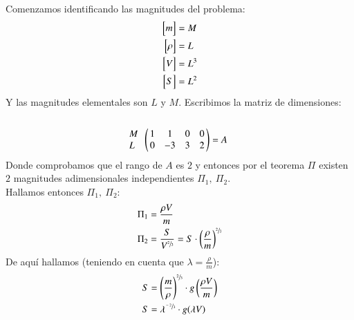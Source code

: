 \begin{ex}[H1.1]
    Comenzamos identificando las magnitudes del problema:
    \begin{align*}
        \mx{m} &= M\\
        \mx{\rho} &= L\\
        \mx{V} &= L^3\\
        \mx{S} &= L^2
    \end{align*}
    Y las magnitudes elementales son $L$ y $M$. Escribimos la matriz de dimensiones:
    $$
    \Dmx{
        ~ & & & & \cr
        M & 1 & 1 & 0 & 0\cr
        L & 0 & -3 & 3 & 2
        } = A
    $$
    Donde comprobamos que el rango de $A$ es $2$ y entonces por el teorema $\Pi$ existen $2$ magnitudes adimensionales independientes $\Pi_1,\ \Pi_2$.\\

    Hallamos entonces $\Pi_1,\ \Pi_2$:
    \begin{align*}
        \Pi_1 &= \frac{\rho V}{m}\\
        \Pi_2 &= \frac{S}{V^{\sfrac{2}{3}}} = S \cdot \left(\frac{\rho}{m}\right)^{\sfrac{2}{3}}
    \end{align*}
    De aquí hallamos (teniendo en cuenta que $\lambda = \frac{\rho}{m}$):
    \begin{align*}
        S &= \left(\frac{m}{\rho}\right)^{\sfrac{2}{3}} \cdot g\left(\frac{\rho V}{m}\right)\\
        S &= \lambda^{\sfrac{-2}{3}} \cdot g(\lambda V)
    \end{align*}
\end{ex}


